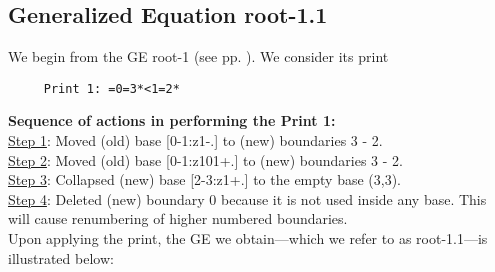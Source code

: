 \documentclass[final]{article}
\begin{document}
\subsection*{Generalized Equation root-1.1}
\label{root-1.1}We begin from the GE root-1 (see pp. \pageref{root-1}).  {We consider its print}
\begin{verbatim}
     Print 1: =0=3*<1=2*
\end{verbatim}
{\bf Sequence of actions in performing the Print 1:}\\
{\underline{Step 1}:} Moved (old) base [0-1:z1-.]  to (new) boundaries 3 - 2.\\
{\underline{Step 2}:} Moved (old) base [0-1:z101+.]  to (new) boundaries 3 - 2.\\
{\underline{Step 3}:} Collapsed (new) base [2-3:z1+.]  to the empty base (3,3).
\\
{\underline{Step 4}:} Deleted (new) boundary 0 because it is not used inside any base.  This will cause renumbering of higher numbered boundaries.
\\[0.1in]
{Upon applying the print, the GE we obtain---which we refer to as root-1.1---is illustrated below:}
\end{document}

